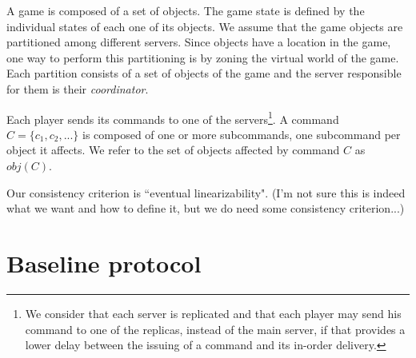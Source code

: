 \documentclass[times, 10pt]{article}
\begin{document}
A game is composed of a set of objects. The game state is defined by the individual states of each one of its objects. We assume that the game objects are partitioned among different servers. Since objects have a location in the game, one way to perform this partitioning is by zoning the virtual world of the game. Each partition consists of a set of objects of the game and the server responsible for them is their \emph{coordinator}.

Each player sends its commands to one of the servers\footnote{We consider that each server is replicated and that each player may send his command to one of the replicas, instead of the main server, if that provides a lower delay between the issuing of a command and its in-order delivery.}. A command $C = \{ c_1, c_2, ... \}$ is composed of one or more subcommands, one subcommand per object it affects. We refer to the set of objects affected by command $C$ as $obj(C)$.


Our consistency criterion is ``eventual linearizability". (I'm not sure this is indeed what we want and how to define it, but we do need some consistency criterion...)


% 
%
%



\section{Baseline protocol}
\end{document}
